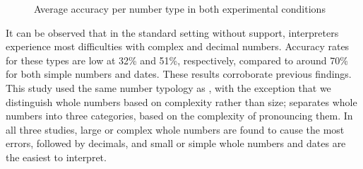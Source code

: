 \documentclass[output=paper]{langsci/langscibook}
\begin{document}
\begin{figure}
\caption{Average accuracy per number type in both experimental conditions\label{fig:01:2}}
\end{figure}

It can be observed that in the standard setting without support, interpreters experience most difficulties with complex and decimal numbers. Accuracy rates for these types are low at 32\% and 51\%, respectively, compared to around 70\% for both simple numbers and dates. These results corroborate previous findings. This study used the same number typology as \citet{Mazza2001}, with the exception that we distinguish whole numbers based on complexity rather than size; \citet{Pinochi2009} separates whole numbers into three categories, based on the complexity of pronouncing them. In all three studies, large or complex whole numbers are found to cause the most errors, followed by decimals, and small or simple whole numbers and dates are the easiest to interpret.
\end{document}
